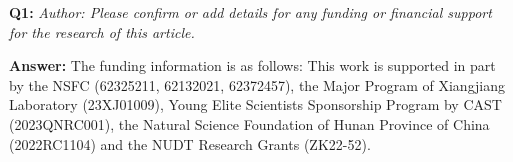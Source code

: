 \documentclass{article}
\begin{document}







\textbf{Q1:}
\emph{Author: Please confirm or add details for any funding or financial support for the research of this article.}

\textbf{Answer:} 
The funding information is as follows:
This work is supported in part by the NSFC (62325211, 62132021, 62372457), the Major Program of Xiangjiang Laboratory (23XJ01009), Young Elite Scientists Sponsorship Program by CAST (2023QNRC001), the Natural Science Foundation of Hunan Province of China (2022RC1104) and the NUDT Research Grants (ZK22-52).
\end{document}
